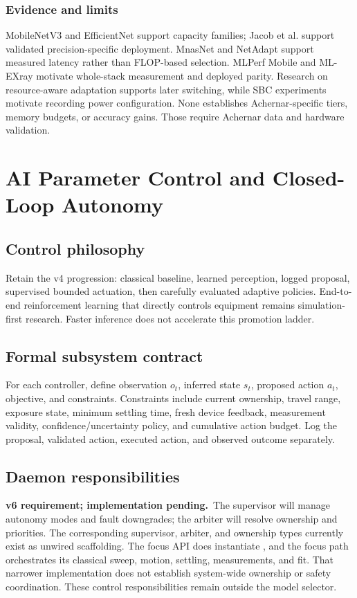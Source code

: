 \documentclass[11pt,a4paper]{article}
\newcommand{\code}[1]{\texttt{\detokenize{#1}}}
\newcommand{\planned}{\textbf{v6 requirement; implementation pending.}\ }
\begin{document}
\subsubsection{Evidence and limits}
MobileNetV3 and EfficientNet support capacity families; Jacob et al. support
validated precision-specific deployment\cite{mobilenet,efficientnet,jacob}.
MnasNet and NetAdapt support measured latency rather than FLOP-based
selection\cite{mnasnet,netadapt}. MLPerf Mobile and ML-EXray motivate whole-stack
measurement and deployed parity\cite{mlperfmobile,mlexray}. Research on
resource-aware adaptation supports later switching\cite{nestdnn,approxdet},
while SBC experiments motivate recording power configuration\cite{sbc}.
None establishes Achernar-specific tiers, memory budgets, or accuracy gains.
Those require Achernar data and hardware validation.

\section{AI Parameter Control and Closed-Loop Autonomy}
\subsection{Control philosophy}
Retain the v4 progression: classical baseline, learned perception, logged
proposal, supervised bounded actuation, then carefully evaluated adaptive
policies. End-to-end reinforcement learning that directly controls equipment
remains simulation-first research. Faster inference does not accelerate this
promotion ladder.

\subsection{Formal subsystem contract}
For each controller, define observation $o_t$, inferred state $s_t$, proposed
action $a_t$, objective, and constraints. Constraints include current ownership,
travel range, exposure state, minimum settling time, fresh device feedback,
measurement validity, confidence/uncertainty policy, and cumulative action
budget. Log the proposal, validated action, executed action, and observed
outcome separately.

\subsection{Daemon responsibilities}
\planned The supervisor will manage autonomy modes and fault downgrades;
the arbiter will resolve ownership and priorities. The corresponding supervisor,
arbiter, and ownership types currently exist as unwired scaffolding. The focus
API does instantiate \code{FocusSafetyGuard}, and the focus path orchestrates
its classical sweep, motion, settling, measurements, and fit. That narrower
implementation does not establish system-wide ownership or safety coordination.
These control responsibilities remain outside the model selector.
\end{document}
